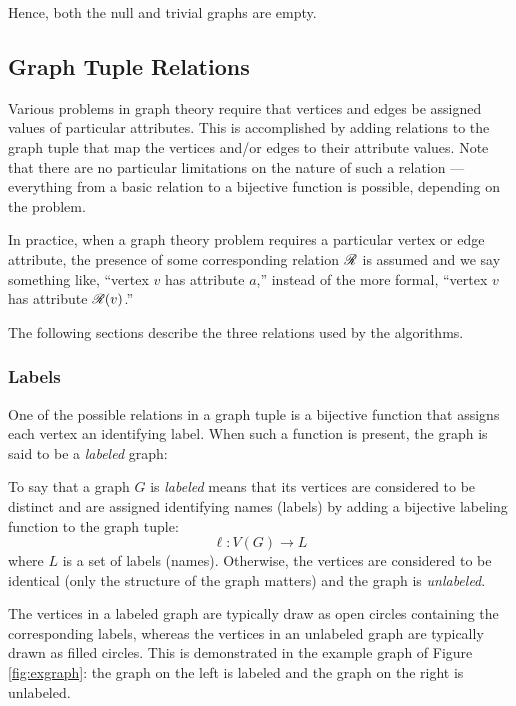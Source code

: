 Hence, both the null and trivial graphs are empty.

\subsection{Graph Tuple Relations}

Various problems in graph theory require that vertices and edges be assigned values of particular attributes.  This
is accomplished by adding relations to the graph tuple that map the vertices and/or edges to their attribute values.
Note that there are no particular limitations on the nature of such a relation --- everything from a basic relation
to a bijective function is possible, depending on the problem.

In practice, when a graph theory problem requires a particular vertex or edge attribute, the presence of some
corresponding relation \(\mathscr{R}\) is assumed and we say something like, ``vertex \(v\) has attribute \(a\),'' instead
of the more formal, ``vertex \(v\) has attribute \(\mathscr{R}(v)\).''

The following sections describe the three relations used by the algorithms.

\subsubsection{Labels}

One of the possible relations in a graph tuple is a bijective function that assigns each vertex an identifying label.
When such a function is present, the graph is said to be a \emph{labeled} graph:

\begin{definition}
  To say that a graph \(G\) is \emph{labeled} means that its vertices are considered to be distinct and are
  assigned identifying names (labels) by adding a bijective labeling function to the graph tuple:
  \[\ell:V(G)\to L\]
  where \(L\) is a set of labels (names).  Otherwise, the vertices are considered to be identical (only the
  structure of the graph matters) and the graph is \emph{unlabeled}.
\end{definition}

The vertices in a labeled graph are typically draw as open circles containing the corresponding labels, whereas the
vertices in an unlabeled graph are typically drawn as filled circles.  This is demonstrated in the example graph of
Figure \ref{fig:exgraph}: the graph on the left is labeled and the graph on the right is unlabeled.


